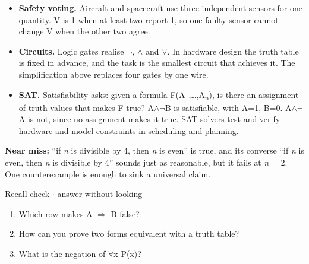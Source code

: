 \documentclass[11pt]{article}
\begin{document}
\begin{keepsection}
\begin{keepsection}
\begin{itemize}
\item \textbf{Safety voting.} Aircraft and spacecraft use three independent sensors for one quantity. V is 1 when at least two report 1, so one faulty sensor cannot change V when the other two agree.
\item \textbf{Circuits.} Logic gates realise \ensuremath{\neg}, \ensuremath{\land} and \ensuremath{\lor}. In hardware design the truth table is fixed in advance, and the task is the smallest circuit that achieves it. The simplification above replaces four gates by one wire.
\item \textbf{SAT.} Satisfiability asks: given a formula F(A\textsubscript{1},…,A\textsubscript{n}), is there an assignment of truth values that makes F true? A\ensuremath{\land}\ensuremath{\neg}B is satisfiable, with A=1, B=0. A\ensuremath{\land}\ensuremath{\neg}A is not, since no assignment makes it true. SAT solvers test and verify hardware and model constraints in scheduling and planning.
\end{itemize}

\begin{notebox}\textbf{Near miss:} “if \textit{n} is divisible by 4, then \textit{n} is even” is true, and its converse “if \textit{n} is even, then \textit{n} is divisible by 4” sounds just as reasonable, but it fails at \textit{n} = 2. One counterexample is enough to sink a universal claim.\end{notebox}

\begin{recallbox}{Recall check \ensuremath{\cdot} answer without looking}
\begin{enumerate}
\item Which row makes A \ensuremath{\Rightarrow} B false?
\item How can you prove two forms equivalent with a truth table?
\item What is the negation of \ensuremath{\forall}x P(x)?
\end{enumerate}

\end{recallbox}
\end{keepsection}
\end{keepsection}
\end{document}
